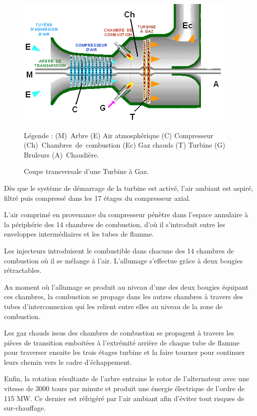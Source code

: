 \begin{figure}[htb]
\centering
\includegraphics[scale=1]{./Figures/coupe_tg.png}
\caption{Coupe transversale d'une Turbine à Gaz.        }
Légende : \hbox{(M) Arbre} (E) Air atmosphérique     (C) Compresseur \hbox{(Ch) Chambres de combustion} (Ec) Gaz chauds  (T) Turbine (G) Bruleurs (A)\hbox{ Chaudière}.
\end{figure}

Dès que le système de démarrage de la turbine est activé, l'air ambiant est aspiré, filtré puis compressé dans les 17 étages du compresseur axial. 
 
L'air comprimé en provenance du compresseur pénètre dans l'espace annulaire à la périphérie des 14 chambres de combustion, d'où il s'introduit entre les enveloppes intermédiaires et les tubes de flamme. 

Les injecteurs introduisent le combustible dans chacune des 14 chambres de combustion où il se mélange à l'air. L'allumage s'effectue grâce à deux bougies rétractables.

Au moment où l'allumage se produit au niveau d'une des deux bougies équipant ces chambres, la combustion se propage dans les autres chambres à travers des tubes d'interconnexion qui les relient entre elles au niveau de la zone de combustion. 

Les gaz chauds issus des chambres de combustion se propagent à travers les pièces de transition emboitées à l'extrémité arrière de chaque tube de flamme pour traverser ensuite les trois étages turbine et la faire tourner pour continuer leurs chemin vers le cadre d'échappement. 

Enfin, la rotation résultante de l'arbre entraine le rotor de l'alternateur avec une vitesse de 3000 tours par minute et produit une énergie électrique de l'ordre de 115 MW. Ce dernier est réfrigéré par l'air ambiant afin d'éviter tout risques de sur-chauffage.

